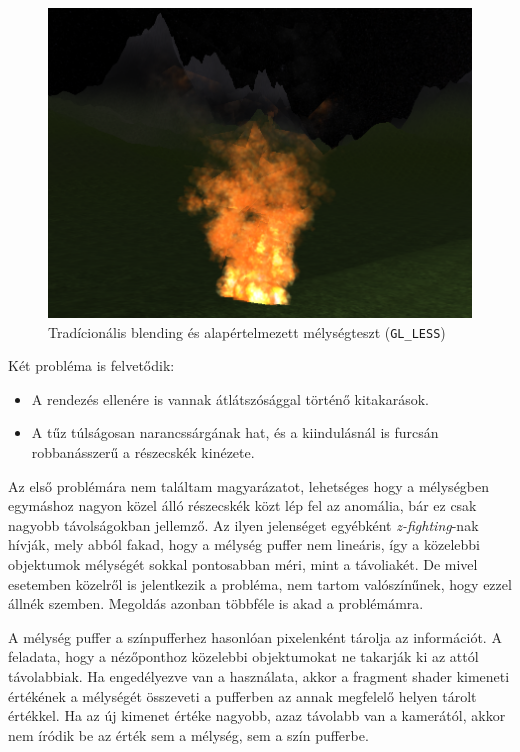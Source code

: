 \begin{figure}[h]
 \centering
 \includegraphics[width=\textwidth]{kepek/particleFireBasic1.png}
 \caption{Tradícionális blending és alapértelmezett mélységteszt (\texttt{GL\_LESS})}
 \label{fig:particleFireBasic1}
\end{figure}

Két probléma is felvetődik: 
\begin{itemize}
\item A rendezés ellenére is vannak átlátszósággal történő kitakarások.
\item A tűz túlságosan narancssárgának hat, és a kiindulásnál is furcsán robbanásszerű a részecskék kinézete.
\end{itemize}

Az első problémára nem találtam magyarázatot, lehetséges hogy a mélységben egymáshoz nagyon közel álló részecskék közt lép fel az anomália, bár ez csak nagyobb távolságokban jellemző. Az ilyen jelenséget egyébként \textit{z-fighting}-nak hívják, mely abból fakad, hogy a mélység puffer nem lineáris, így a közelebbi objektumok mélységét sokkal pontosabban méri, mint a távoliakét. De mivel esetemben közelről is jelentkezik a probléma, nem tartom valószínűnek, hogy ezzel állnék szemben. Megoldás azonban többféle is akad a problémámra.

A mélység puffer a színpufferhez hasonlóan pixelenként tárolja az információt. A feladata, hogy a nézőponthoz közelebbi objektumokat ne takarják ki az attól távolabbiak. Ha engedélyezve van a használata, akkor a fragment shader kimeneti értékének a mélységét összeveti a pufferben az annak megfelelő helyen tárolt értékkel. Ha az új kimenet értéke nagyobb, azaz távolabb van a kamerától, akkor nem íródik be az érték sem a mélység, sem a szín pufferbe. 

